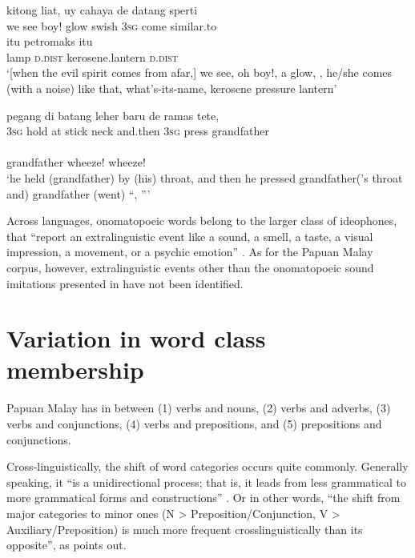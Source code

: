 \ea
\label{Example_5.346}
\gll  {\ldots}  {kitong}  {liat,}  uy  cahaya  {}  de  datang  sperti\\
 { }   {we}  {see}  boy!  glow  {swish}  \textsc{3sg}  come  similar.to\\
  {itu}  {petromaks}  {itu}\\
 {lamp}  {\textsc{d.dist}}  {kerosene.lantern}  {\textsc{d.dist}}\\
\glt 
‘[when the evil spirit comes from afar,] we see, oh boy!, a glow, , he/she comes (with a noise) like that, what’s-its-name, kerosene pressure lantern’ \textstyleExampleSource{[081006-022-CvEx.0153]}
\z

\ea
\label{Example_5.347}
 {{pegang}} {di} {{batang}} {leher} {baru} {de} {ramas} {tete,}\\ %
 \textsc{3sg}  {hold}  at  {stick}  neck  and.then  \textsc{3sg}  press  grandfather\\
  {}  {}\\
 {grandfather}  {wheeze!}  {wheeze!}\\
\glt 
‘he held (grandfather) by (his) throat, and then he pressed grandfather(’s throat and) grandfather (went) ``, ''' \textstyleExampleSource{[081015-001-Cv.0012/0014]}
\z


Across languages, onomatopoeic words belong to the larger class of ideo\-pho\-nes, that “report an extralinguistic event like a sound, a smell, a taste, a visual impression, a movement, or a psychic emotion” \citep[510]{KilianHatz.2006}. As for the Papuan Malay corpus, however, extralinguistic events other than the onomatopoeic sound imitations presented in   have not been identified.


\section{Variation in word class membership}
\label{Para_5.14}
Papuan Malay has  in  between (1) verbs and nouns, (2) verbs and adverbs, (3) verbs and conjunctions, (4) verbs and prepositions, and (5) prepositions and conjunctions.


\newpage 
Cross-linguistically, the shift of word categories occurs quite commonly. Generally speaking, it “is a unidirectional process; that is, it leads from less grammatical to more grammatical forms and constructions” \citep[4]{Heine.2002}. Or in other words, “the shift from major categories to minor ones (N {\textgreater} Preposition/Conjunction, V {\textgreater} Auxiliary/Preposition) is much more frequent crosslinguistically than its opposite”, as {\citet[133]{Wischer.2006}} points out.



